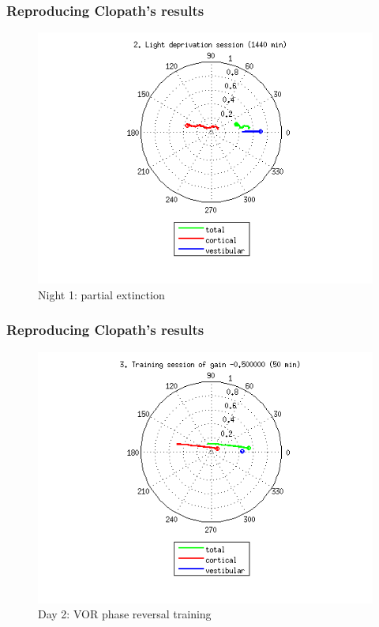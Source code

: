 \documentclass[10pt, compress]{beamer}
\begin{document}
\begin{frame}[fragile]
  \frametitle{Reproducing Clopath's results}
  \begin{figure}
    \includegraphics[scale=0.5]{images/longnoi_20.png}
    \caption{Night 1: partial extinction}
  \end{figure}
\end{frame}

\begin{frame}[fragile]
  \frametitle{Reproducing Clopath's results}
  \begin{figure}
    \includegraphics[scale=0.5]{images/longnoi_21.png}
    \caption{Day 2: VOR phase reversal training}
  \end{figure}
\end{frame}
\end{document}
